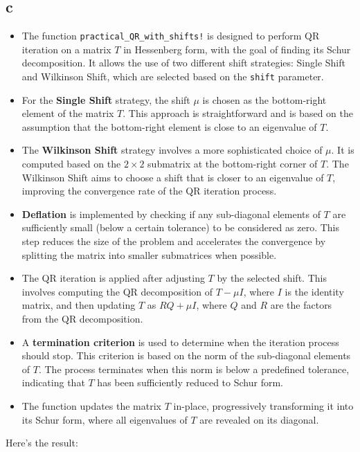 \documentclass{article}
\begin{document}
\subsection{c}
\begin{itemize}
    \item The function \texttt{practical\_QR\_with\_shifts!} is designed to perform QR iteration on a matrix $T$ in Hessenberg form, with the goal of finding its Schur decomposition. It allows the use of two different shift strategies: Single Shift and Wilkinson Shift, which are selected based on the \texttt{shift} parameter.

    \item For the \textbf{Single Shift} strategy, the shift $\mu$ is chosen as the bottom-right element of the matrix $T$. This approach is straightforward and is based on the assumption that the bottom-right element is close to an eigenvalue of $T$.

    \item The \textbf{Wilkinson Shift} strategy involves a more sophisticated choice of $\mu$. It is computed based on the $2 \times 2$ submatrix at the bottom-right corner of $T$. The Wilkinson Shift aims to choose a shift that is closer to an eigenvalue of $T$, improving the convergence rate of the QR iteration process.

    \item \textbf{Deflation} is implemented by checking if any sub-diagonal elements of $T$ are sufficiently small (below a certain tolerance) to be considered as zero. This step reduces the size of the problem and accelerates the convergence by splitting the matrix into smaller submatrices when possible.

    \item The QR iteration is applied after adjusting $T$ by the selected shift. This involves computing the QR decomposition of $T - \mu I$, where $I$ is the identity matrix, and then updating $T$ as $RQ + \mu I$, where $Q$ and $R$ are the factors from the QR decomposition.

    \item A \textbf{termination criterion} is used to determine when the iteration process should stop. This criterion is based on the norm of the sub-diagonal elements of $T$. The process terminates when this norm is below a predefined tolerance, indicating that $T$ has been sufficiently reduced to Schur form.

    \item The function updates the matrix $T$ in-place, progressively transforming it into its Schur form, where all eigenvalues of $T$ are revealed on its diagonal.
\end{itemize}
Here's the result:
\end{document}
